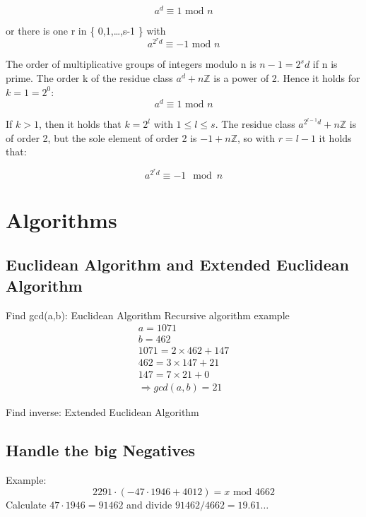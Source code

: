 \documentclass[a4paper]{article}
\begin{document}
\[ a^d \equiv 1 \text{ mod } n \]

or there is one r in \{ 0,1,\dots,s-1 \} with
\[ a^{2^r d} \equiv -1 \text{ mod } n \]

The order of multiplicative groups of integers modulo n is $n-1=2^sd$ if n is prime. The order k of the residue class $a^d + n\mathbb{Z}$ is a power of 2. Hence it holds for $k = 1 = 2^0$:
\[ a^d \equiv 1 \text{ mod } n \]

If $k>1$, then it holds that $k=2^l$ with $1 \leq l \leq s$. The residue class $a^{2^{l-1}d} + n\mathbb{Z}$ is of order 2, but the sole element of order 2 is $-1 + n\mathbb{Z}$, so with $r=l-1$ it holds that:

\[ a^{2^rd} \equiv -1 \mod n \]


\section{Algorithms}
\subsection{Euclidean Algorithm and Extended Euclidean Algorithm}
Find gcd(a,b): Euclidean Algorithm
Recursive algorithm example 
\begin{equation}
    \begin{split}
	a = 1071 \\
	b = 462 \\
	1071 = 2 \times 462 +  147 \\
	462 = 3 \times  147 + 21 \\
	147 = 7 \times 21 + 0 \\ 
	\Rightarrow gcd(a,b) = 21
    \end{split}
        \label{euclidean_example}
\end{equation}

Find inverse: Extended Euclidean Algorithm
\subsection{Handle the big Negatives}
Example:
\[ 2291 \cdot (-47 \cdot 1946 + 4012) = x \text{ mod } 4662\]
Calculate $47 \cdot 1946 = 91462$ and divide $91462/4662 = 19.61\dots$
\end{document}
